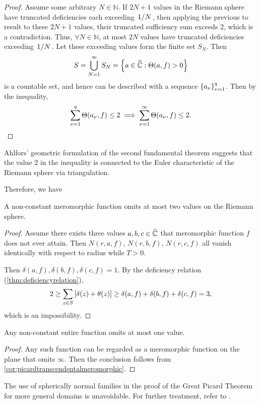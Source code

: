 \begin{proof}
    Assume some arbitrary \(N\in\mathbb{N}\). If \(2N+1\) values in the Riemann sphere have truncated deficiencies each exceeding \(\flatfrac1N\), then applying the previous to result to these \(2N+1\) values, their truncated sufficiency sum exceeds 2, which is a contradiction. Thus, \(\forall N\in\mathbb{N}\), at most \(2N\) values have truncated deficiencies exceeding \(\flatfrac1N\). Let these exceeding values form the finite set \(S_N\). Then \[S=\bigcup_{N=1}^\infty S_N=\cbraces{a\in\extcomplex}{\Theta(a,f)>0}\] is a countable set, and hence can be described with a sequence \(\qty{a_\nu}_{\nu=1}^q\). Then by the inequality, \[\sum_{\nu=1}^q\Theta\qty(a_\nu,f)\leq 2\implies\sum_{\nu=1}^{\infty}\Theta\qty(a_\nu,f)\leq 2.\qedhere\]
\end{proof}
\begin{remark}
    Ahlfors' geometric formulation of the second fundamental theorem suggests that the value 2 in the inequality is connected to the Euler characteristic of the Riemann sphere via triangulation.
\end{remark}
Therefore, we have
\begin{corollary}\label{cor:picardtranscendentalmeromorphic}
    A non-constant meromorphic function omits at most two values on the Riemann sphere.
\end{corollary}
\begin{proof}
    Assume there exists three values \(a,b,c\in\widehat{\mathbb{C}}\) that meromorphic function \(f\) does not ever attain. Then \(N(r,a,f)\), \(N(r,b,f)\), \(N(r,c,f)\) all vanish identically with respect to radius while \(T>0\).

    Then \(\delta(a,f),\delta(b,f),\delta(c,f)=1\). By the deficiency relation (\cref{thm:deficiencyrelation}), \[2\geq\sum_{z\in S}\qty[\delta(z)+\theta(z)]\geq\delta(a,f)+\delta(b,f)+\delta(c,f)=3,\]
    which is an impossibility.
\end{proof}
\begin{corollary}
    Any non-constant entire function omits at most one value.
\end{corollary}
\begin{proof}
    Any such function can be regarded as a meromorphic function on the plane that omits \(\infty\). Then the conclusion follows from \cref{cor:picardtranscendentalmeromorphic}.
\end{proof}
The use of spherically normal families in the proof of the Great Picard Theorem for more general domains is unavoidable. For further treatment, refer to \cite{hayman1964meromorphic}.
